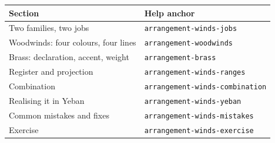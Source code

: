 \begin{helpmapping}
\begin{longtable}{p{}p{}}
\toprule
Section & Help anchor \\
\midrule
Two families, two jobs & \texttt{arrangement-winds-jobs} \\
Woodwinds: four colours, four lines & \texttt{arrangement-woodwinds} \\
Brass: declaration, accent, weight & \texttt{arrangement-brass} \\
Register and projection & \texttt{arrangement-winds-ranges} \\
Combination & \texttt{arrangement-winds-combination} \\
Realising it in Yeban & \texttt{arrangement-winds-yeban} \\
Common mistakes and fixes & \texttt{arrangement-winds-mistakes} \\
Exercise & \texttt{arrangement-winds-exercise} \\
\bottomrule
\end{longtable}
\end{helpmapping}
